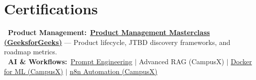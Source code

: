 \documentclass[letterpaper,10pt]{article}
\begin{document}
\section{Certifications}
 \begin{itemize}[leftmargin=0.15in, label={}]
    \small{\item{
     \textbf{\textbullet\ Product Management:}\ \href{https://drive.google.com/file/d/199XpTr2wp9waMzs4I5PiToiuOoKuQvJK/view?usp=drive_link}{\textbf{Product Management Masterclass (GeeksforGeeks)}} --- Product lifecycle, JTBD discovery frameworks, and roadmap metrics. \\
     \textbf{\textbullet\ AI \& Workflows:}\ \href{https://drive.google.com/file/d/1NqDNLf16tuThGlGOO2cFp1IxiTjWQCFP/view?usp=drive_link}{Prompt Engineering} $|$ Advanced RAG (CampusX) $|$ \href{https://drive.google.com/file/d/16eh0ob2JVliyVaThmYrngZXz-AVuKIV0/view?usp=drive_link}{Docker for ML (CampusX)} $|$ \href{https://drive.google.com/file/d/1phqwetDgCSHg1ykofHUi9J4a7JWGJ74Y/view?usp=drive_link}{n8n Automation (CampusX)}
    }}
 \end{itemize}

\end{document}
